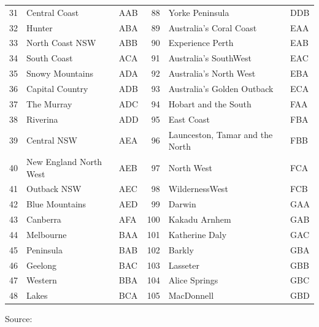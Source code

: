 \documentclass[a4paper,11pt]{article}
\theoremstyle{definition}
\begin{document}
\begin{table}[H]
\begin{tabular}{r l l|r l l}
		31     & Central Coast & AAB  & 88      & Yorke Peninsula       & DDB  \\
		32     & Hunter        & ABA  & 89      & Australia’s Coral Coast         & EAA  \\
		33     & North Coast NSW         & ABB  & 90      & Experience Perth      & EAB  \\
		34     & South Coast   & ACA  & 91      & Australia’s SouthWest & EAC  \\
		35     & Snowy Mountains         & ADA  & 92      & Australia’s North West          & EBA  \\
		36     & Capital Country         & ADB  & 93      & Australia’s Golden Outback      & ECA  \\
		37     & The Murray    & ADC  & 94      & Hobart and the South  & FAA  \\
		38     & Riverina      & ADD  & 95      & East Coast  & FBA  \\
		39     & Central NSW   & AEA  & 96      & Launceston, Tamar and the North & FBB  \\
		40     & New England North West  & AEB  & 97      & North West  & FCA  \\
		41     & Outback NSW   & AEC  & 98      & WildernessWest        & FCB  \\
		42     & Blue Mountains          & AED  & 99      & Darwin      & GAA  \\
		43     & Canberra      & AFA  & 100     & Kakadu Arnhem         & GAB  \\
		44     & Melbourne     & BAA  & 101     & Katherine Daly        & GAC  \\
		45     & Peninsula     & BAB  & 102     & Barkly      & GBA  \\
		46     & Geelong       & BAC  & 103     & Lasseter    & GBB  \\
		47     & Western       & BBA  & 104     & Alice Springs         & GBC  \\
		48     & Lakes         & BCA  & 105     & MacDonnell & GBD\\
		\bottomrule
	\end{tabular}
	\begin{flushleft}
		\begin{footnotesize}
			Source: \cite{wickramasuriya2019, difonzo2022a}
		\end{footnotesize}
	\end{flushleft}
\end{table}
\end{document}
